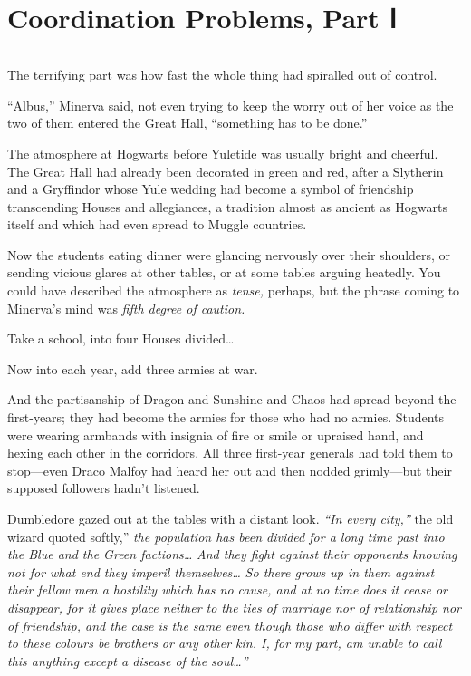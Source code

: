 \chapter{Coordination Problems, Part Ⅰ}

\begin{center}\rule{3in}{0.4pt}\end{center}

The terrifying part was how fast the whole thing had spiralled out of
control.

``Albus,'' Minerva said, not even trying to keep the worry out of her
voice as the two of them entered the Great Hall, ``something has to be
done.''

The atmosphere at Hogwarts before Yuletide was usually bright and
cheerful. The Great Hall had already been decorated in green and red,
after a Slytherin and a Gryffindor whose Yule wedding had become a
symbol of friendship transcending Houses and allegiances, a tradition
almost as ancient as Hogwarts itself and which had even spread to Muggle
countries.

Now the students eating dinner were glancing nervously over their
shoulders, or sending vicious glares at other tables, or at some tables
arguing heatedly. You could have described the atmosphere as
\emph{tense,} perhaps, but the phrase coming to Minerva's mind was
\emph{fifth degree of caution.}

Take a school, into four Houses divided\ldots{}

Now into each year, add three armies at war.

And the partisanship of Dragon and Sunshine and Chaos had spread beyond
the first-years; they had become the armies for those who had no armies.
Students were wearing armbands with insignia of fire or smile or
upraised hand, and hexing each other in the corridors. All three
first-year generals had told them to stop---even Draco Malfoy had heard
her out and then nodded grimly---but their supposed followers hadn't
listened.

Dumbledore gazed out at the tables with a distant look. \emph{``In every
city,''} the old wizard quoted softly,'' \emph{the population has been
divided for a long time past into the Blue and the Green
factions\ldots{}} \emph{And they fight against their opponents knowing
not for what end they imperil themselves\ldots{}} \emph{So there grows
up in them against their fellow men a hostility which has no cause, and
at no time does it cease or disappear, for it gives place neither to the
ties of marriage nor of relationship nor of friendship, and the case is
the same even though those who differ with respect to these colours be
brothers or any other kin. I, for my part, am unable to call this
anything except a disease of the soul\ldots{}''}

